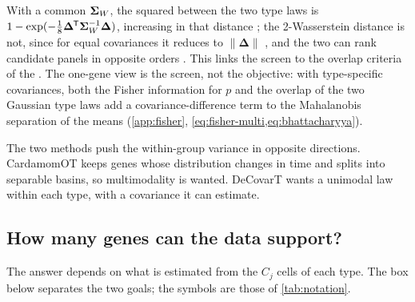 \documentclass[11pt,a4paper]{article}
\begin{document}
With a common $\bm{\Sigma}_W$, the squared  between the two type
laws is $1-\exp(-\tfrac18\bm\Delta^{\mkern-1.5mu\mathsf{T}}\bm{\Sigma}_W^{-1}\bm\Delta)$, increasing in that distance ; the
2-Wasserstein distance is not, since for equal covariances it reduces to $\lVert\bm\Delta\rVert$
, and the two can rank candidate panels in opposite orders . This links the screen to the
overlap criteria of the . The one-gene view
is the screen, not the objective: with type-specific covariances, both the Fisher information for $p$ and the
overlap of the two Gaussian type laws add a covariance-difference term to the Mahalanobis separation of the
means (\cref{app:fisher}, \cref{eq:fisher-multi,eq:bhattacharyya}).

The two methods push the within-group variance in opposite directions. CardamomOT keeps genes whose
distribution changes in time and splits into separable basins, so multimodality is wanted. DeCovarT
wants a unimodal law within each type, with a covariance it can estimate.

\subsection{How many genes can the data support?}\label{sec:ceiling}

The answer depends on what is estimated from the $C_j$ cells of each type. The box below separates the
two goals; the symbols are those of \cref{tab:notation}.
\end{document}
